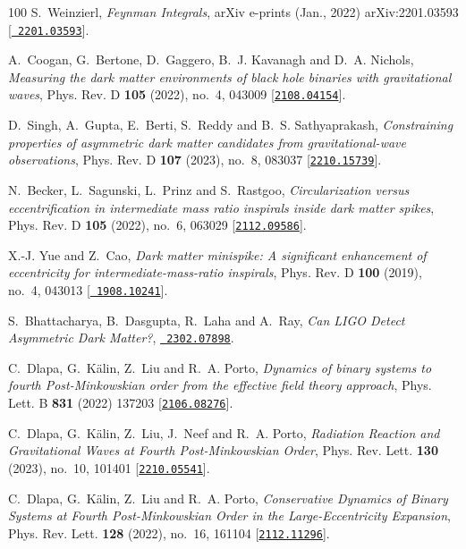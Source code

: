 \begin{thebibliography}{100}
S.~{Weinzierl},  {\em {Feynman Integrals}}, arXiv e-prints (Jan., 2022)
  arXiv:2201.03593 [\href{http://www.arXiv.org/abs/2201.03593}{{\tt
  2201.03593}}].

A.~Coogan, G.~Bertone, D.~Gaggero, B.~J. Kavanagh and D.~A. Nichols,  {\em
  {Measuring the dark matter environments of black hole binaries with
  gravitational waves}}, Phys. Rev. D {\bf 105} (2022), no.~4, 043009
  [\href{http://www.arXiv.org/abs/2108.04154}{{\tt 2108.04154}}].

D.~Singh, A.~Gupta, E.~Berti, S.~Reddy and B.~S. Sathyaprakash,  {\em
  {Constraining properties of asymmetric dark matter candidates from
  gravitational-wave observations}}, Phys. Rev. D {\bf 107} (2023), no.~8,
  083037 [\href{http://www.arXiv.org/abs/2210.15739}{{\tt 2210.15739}}].

N.~Becker, L.~Sagunski, L.~Prinz and S.~Rastgoo,  {\em {Circularization versus
  eccentrification in intermediate mass ratio inspirals inside dark matter
  spikes}}, Phys. Rev. D {\bf 105} (2022), no.~6, 063029
  [\href{http://www.arXiv.org/abs/2112.09586}{{\tt 2112.09586}}].

X.-J. Yue and Z.~Cao,  {\em {Dark matter minispike: A significant enhancement
  of eccentricity for intermediate-mass-ratio inspirals}}, Phys. Rev. D {\bf
  100} (2019), no.~4, 043013 [\href{http://www.arXiv.org/abs/1908.10241}{{\tt
  1908.10241}}].

S.~Bhattacharya, B.~Dasgupta, R.~Laha and A.~Ray,  {\em {Can LIGO Detect
  Asymmetric Dark Matter?}}, \href{http://www.arXiv.org/abs/2302.07898}{{\tt
  2302.07898}}.

C.~Dlapa, G.~K\"alin, Z.~Liu and R.~A. Porto,  {\em {Dynamics of binary systems
  to fourth Post-Minkowskian order from the effective field theory approach}},
  Phys. Lett. B {\bf 831} (2022) 137203
  [\href{http://www.arXiv.org/abs/2106.08276}{{\tt 2106.08276}}].

C.~Dlapa, G.~K\"alin, Z.~Liu, J.~Neef and R.~A. Porto,  {\em {Radiation
  Reaction and Gravitational Waves at Fourth Post-Minkowskian Order}}, Phys.
  Rev. Lett. {\bf 130} (2023), no.~10, 101401
  [\href{http://www.arXiv.org/abs/2210.05541}{{\tt 2210.05541}}].

C.~Dlapa, G.~K\"alin, Z.~Liu and R.~A. Porto,  {\em {Conservative Dynamics of
  Binary Systems at Fourth Post-Minkowskian Order in the Large-Eccentricity
  Expansion}}, Phys. Rev. Lett. {\bf 128} (2022), no.~16, 161104
  [\href{http://www.arXiv.org/abs/2112.11296}{{\tt 2112.11296}}].


\end{thebibliography}
